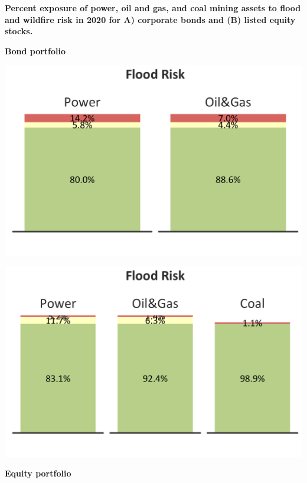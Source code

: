\documentclass[10pt,table,a4]{article}\usepackage[]{graphicx}\usepackage[]{color}
\begin{document}
	\textbf{Percent exposure of power, oil and gas, and coal mining assets to flood and wildfire risk in 2020 for A) corporate bonds and (B) listed equity stocks. }
	
	\textbf{Bond portfolio}
	\begin{multicols}{2}
		
		\includegraphics[width = 1\linewidth]{CAFigures/Fig72}
		
		
		\includegraphics[width = 1\linewidth]{CAFigures/Fig73}
	\end{multicols}
	
	\textbf{Equity portfolio}
\end{document}
